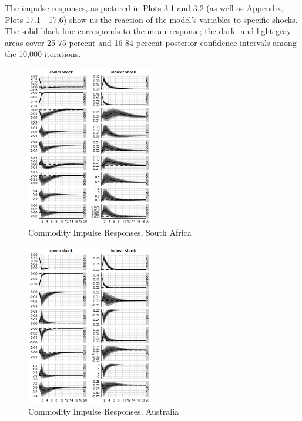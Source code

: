 \documentclass[12pt,]{article}
\begin{document}
The impulse responses, as pictured in Plots 3.1 and 3.2 (as well as
Appendix, Plots 17.1 - 17.6) show us the reaction of the model's
variables to specific shocks. The solid black line corresponds to the
mean response; the dark- and light-gray areas cover 25-75 percent and
16-84 percent posterior confidence intervals among the 10,000
iterations.

\begin{figure}
\centering
\includegraphics[width=0.50000\textwidth]{img/irf_short_ZAF.png}
\caption{Commodity Impulse Responses, South Africa}
\end{figure}

\begin{figure}
\centering
\includegraphics[width=0.50000\textwidth]{img/irf_short_AUS.png}
\caption{Commodity Impulse Responses, Australia}
\end{figure}
\end{document}

